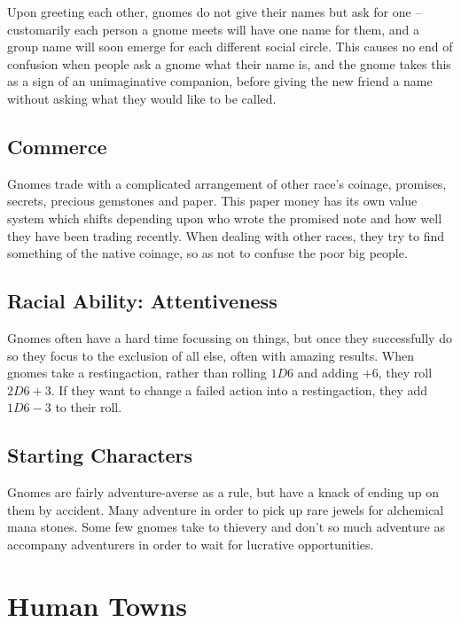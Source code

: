 \begin{multicols}{2}
Upon greeting each other, gnomes do not give their names but ask for one -- customarily each person a gnome meets will have one name for them, and a group name will soon emerge for each different social circle. This causes no end of confusion when people ask a gnome what their name is, and the gnome takes this as a sign of an unimaginative companion, before giving the new friend a name without asking what they would like to be called.

\subsection{Commerce}

Gnomes trade with a complicated arrangement of other race's coinage, promises, secrets, precious gemstones and paper. This paper money has its own value system which shifts depending upon who wrote the promised note and how well they have been trading recently. When dealing with other races, they try to find something of the native coinage, so as not to confuse the poor big people.

\subsection{Racial Ability: Attentiveness}
Gnomes often have a hard time focussing on things, but once they successfully do so they focus to the exclusion of all else, often with amazing results.
When gnomes take a \gls{restingaction}, rather than rolling $1D6$ and adding +6, they roll $2D6+3$.
If they want to change a failed action into a \gls{restingaction}, they add $1D6-3$ to their roll.

\subsection{Starting Characters}
Gnomes are fairly adventure-averse as a rule, but have a knack of ending up on them by accident. Many adventure in order to pick up rare jewels for alchemical mana stones. Some few gnomes take to thievery and don't so much adventure as accompany adventurers in order to wait for lucrative opportunities.

\end{multicols}

\section[Humans]{Human Towns}

